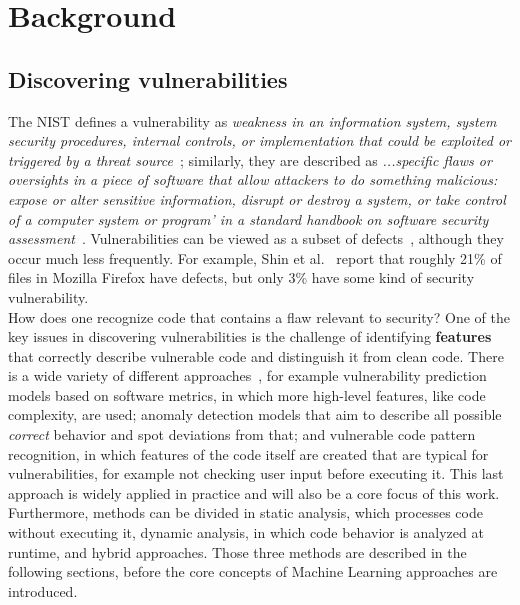 \documentclass[
a4paper,
pagesize,
pdftex,
12pt,
twoside, %
BCOR=5mm, %
ngerman,
fleqn,
final,
]{scrartcl}
\begin{document}
	\newpage
	\section{Background}\label{Background}
	
	\subsection{Discovering vulnerabilities}
	
	The NIST defines a vulnerability as \textit{weakness in an information system, system security procedures, internal controls, or implementation that could be exploited or triggered by a threat source}~\cite{NISTComputerSecurityRessourceCenter.}; similarly, they are described as \textit{...specific flaws or oversights in a piece of software that allow attackers to do something malicious: expose or alter sensitive information, disrupt or destroy a system, or take control of a computer system or program' in a standard handbook on software security assessment}~\cite{Dowd.2006}.
	Vulnerabilities can be viewed as a subset of defects~\cite{Morrison.2015}, although they occur much less frequently. For example, Shin et al.~\cite{Shin.2013} report that roughly 21\% of files in Mozilla Firefox have defects, but only 3\% have some kind of security vulnerability. \\
	How does one recognize code that contains a flaw relevant to security? One of the key issues in discovering vulnerabilities is the challenge of identifying \textbf{features} that correctly describe vulnerable code and distinguish it from clean code. There is a wide variety of different approaches~\cite{Ghaffarian.2017}, for example vulnerability prediction models based on software metrics, in which more high-level features, like code complexity, are used; anomaly detection models that aim to describe all possible \textit{correct} behavior and spot deviations from that; and vulnerable code pattern recognition, in which features of the code itself are created that are typical for vulnerabilities, for example not checking user input before executing it. This last approach is widely applied in practice and will also be a core focus of this work.\\
	Furthermore, methods can be divided in static analysis, which processes code without executing it, dynamic analysis, in which code behavior is analyzed at runtime, and hybrid approaches. Those three methods are described in the following sections, before the core concepts of Machine Learning approaches are introduced.
\end{document}
